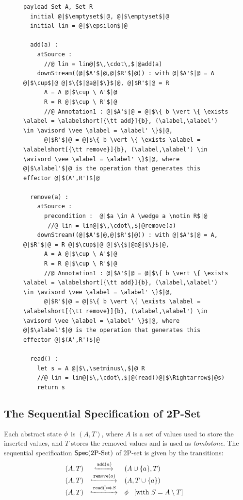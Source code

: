 \begin{figure}[t]
\begin{lstlisting}[frame=top,caption={Pseudo-code of 2P-set},
captionpos=b,label={lst:2P-set}]
  payload Set A, Set R
  initial @|$\emptyset$|@, @|$\emptyset$|@
  initial lin = @|$\epsilon$|@

  add(a) :
    atSource :
      //@ lin = lin@|$\,\cdot\,$|@add(a)
    downStream((@|$A'$|@,@|$R'$|@)) : with @|$A'$|@ = A @|$\cup$|@ @|$\{$|@a@|$\}$|@, @|$R'$|@ = R
      A = A @|$\cup \ A'$|@
      R = R @|$\cup \ R'$|@
      //@ Annotation1 : @|$A'$|@ = @|$\{ b \vert \{ \exists \alabel = \alabelshort[{\tt add}]{b}, (\alabel,\alabel') \in \avisord \vee \alabel = \alabel' \}$|@,
      @|$R'$|@ = @|$\{ b \vert \{ \exists \alabel = \alabelshort[{\tt remove}]{b}, (\alabel,\alabel') \in \avisord \vee \alabel = \alabel' \}$|@, where @|$\alabel'$|@ is the operation that generates this effector @|$(A',R')$|@

  remove(a) :
    atSource :
      precondition :  @|$a \in A \wedge a \notin R$|@
       //@ lin = lin@|$\,\cdot\,$|@remove(a)
    downStream((@|$A'$|@,@|$R'$|@)) : with @|$A'$|@ = A, @|$R'$|@ = R @|$\cup$|@ @|$\{$|@a@|$\}$|@,
      A = A @|$\cup \ A'$|@
      R = R @|$\cup \ R'$|@
      //@ Annotation1 : @|$A'$|@ = @|$\{ b \vert \{ \exists \alabel = \alabelshort[{\tt add}]{b}, (\alabel,\alabel') \in \avisord \vee \alabel = \alabel' \}$|@,
      @|$R'$|@ = @|$\{ b \vert \{ \exists \alabel = \alabelshort[{\tt remove}]{b}, (\alabel,\alabel') \in \avisord \vee \alabel = \alabel' \}$|@, where @|$\alabel'$|@ is the operation that generates this effector @|$(A',R')$|@

  read() :
    let s = A @|$\,\setminus\,$|@ R
    //@ lin = lin@|$\,\cdot\,$|@(read()@|$\Rightarrow$|@s)
    return s
\end{lstlisting}
\end{figure}



\subsection{The Sequential Specification of 2P-Set}
\label{subsec:the sequential specification of 2P-set}

Each abstract state $\abstate$ is $(A,T)$, where $A$ is a set of values used to store the inserted values, and $T$ stores the removed values and is used as \emph{tombstone}. The sequential specification $\specTwoPSet$ of 2P-set is given by the transitions:
\[
  \begin{array}{rcl}
    (A,T) &
               \specarrow{\alabelshort[\mathtt{add}]{a}}
    & (A \cup \{ a \},T) \\
    (A,T) &
               \specarrow{\alabelshort[\mathtt{remove}]{a}}
    & (A,T \cup \{a\}) \\
    (A,T)
    & \specarrow{\alabellong[\mathtt{read}]{}{ S }{}}
    & \abstate\
      \begin{array}{c}
        [\text{with}\ S = A \setminus T]
      \end{array}
  \end{array}
\]

